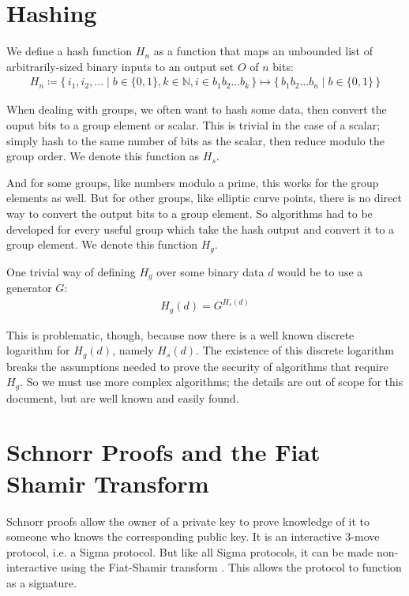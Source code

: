 \documentclass{article}
\newcommand\Set[2]{\{\,#1\mid#2\,\}}
\begin{document}
\section{
  Hashing
}

We define a hash function $H_n$ as a function that maps an unbounded list of arbitrarily-sized binary inputs to an output set $O$ of $n$ bits:
\begin{align}
  H_n \coloneqq \Set{i_1, i_2, ...}{b \in \{0,1\}, k \in \mathbb{N}, i \in {b_1b_2...b_k}} \mapsto \Set{b_1b_2...b_n}{b \in \{0,1\}}\nonumber
\end{align}

When dealing with groups, we often want to hash some data, then convert the ouput bits to a group element or scalar.  This is trivial in the case of a scalar; simply hash to the same number of bits as the scalar, then reduce modulo the group order.  We denote this function as $H_s$.

And for some groups, like numbers modulo a prime, this works for the group elements as well.  But for other groups, like elliptic curve points, there is no direct way to convert the output bits to a group element.  So algorithms had to be developed for every useful group which take the hash output and convert it to a group element.  We denote this function $H_g$.

One trivial way of defining $H_g$ over some binary data $d$ would be to use a generator $G$:
\begin{align}
  H_g(d) = G^{H_s(d)}\nonumber
\end{align}

This is problematic, though, because now there is a well known discrete logarithm for $H_g(d)$, namely $H_s(d)$.  The existence of this discrete logarithm breaks the assumptions needed to prove the security of algorithms that require $H_g$.  So we must use more complex algorithms; the details are out of scope for this document, but are well known and easily found.

\section{
  Schnorr Proofs and the Fiat Shamir Transform
}

Schnorr proofs \cite{schnorr} allow the owner of a private key to prove knowledge of it to someone who knows the corresponding public key.  It is an interactive 3-move protocol, i.e. a Sigma protocol.  But like all Sigma protocols, it can be made non-interactive using the Fiat-Shamir transform \cite{fiatshamir}.  This allows the protocol to function as a signature.
\end{document}
